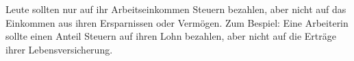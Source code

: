 Leute sollten nur auf ihr Arbeitseinkommen Steuern bezahlen, aber nicht auf das Einkommen aus ihren Ersparnissen oder Vermögen.
Zum Bespiel: Eine Arbeiterin sollte einen Anteil Steuern auf ihren Lohn bezahlen, aber nicht auf die Erträge ihrer Lebensversicherung.